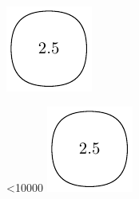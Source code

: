 \documentclass[dvipdfmx]{article}
\begin{document}
\parindent0pt
\includegraphics[page=1]{sue-mp.pdf}

\makeatletter
{}
\loop\ifnum\@tempcnta<10000
  \noindent\includegraphics[page=1]{sue-mp.pdf}\hfil
  \advance{}
\repeat
\end{document}
